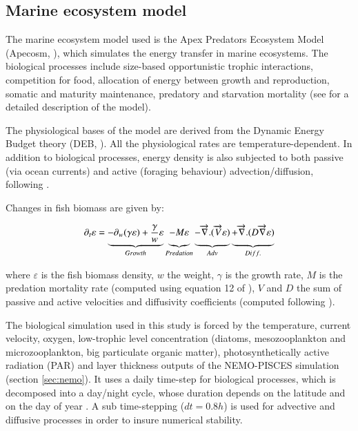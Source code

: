 \subsection{Marine ecosystem model}
\label{sec:apecosm}

The marine ecosystem model used is the Apex Predators Ecosystem Model (Apecosm, \citealt{mauryModelingEnvironmentalEffects2007, mauryOverviewAPECOSMSpatialized2010}), which simulates the energy transfer in marine ecosystems. The biological processes include size-based opportunistic trophic interactions, competition for food, allocation of energy between growth and reproduction, somatic and maturity maintenance, predatory and starvation mortality (see \citealt{mauryModelingEnvironmentalEffects2007} for a detailed description of the model). 

The physiological bases of the model are derived from the Dynamic Energy Budget theory (DEB, \citealt{kooijmanDynamicEnergyMass2000}). All the physiological rates are temperature-dependent. In addition to biological processes, energy density is also subjected to both passive (via ocean currents) and active (foraging behaviour) advection/diffusion, following \cite{faugerasAdvectiondiffusionreactionSizestructuredFish2005}.

Changes in fish biomass are given by:

\begin{equation}
\partial_t \varepsilon = \underbrace{- \partial_w(\gamma \varepsilon) + \frac{\gamma}{w}\varepsilon}_{Growth} 
\underbrace{- M \varepsilon \vphantom{\frac{\gamma}{w}\varepsilon}}_{Predation}
\underbrace{-\overrightarrow{\nabla}.(\overrightarrow{V} \varepsilon) \vphantom{\frac{\gamma}{w}\varepsilon}}_{Adv} 
\underbrace{+ \overrightarrow{\nabla} . (D \overrightarrow{\nabla} \varepsilon) \vphantom{\frac{\gamma}{w}\varepsilon}}_{Diff.}
\label{eq:apecosm_trend}
\end{equation}

where $\varepsilon$  is the fish biomass density, $w$ the weight, $\gamma$ is the growth rate, $M$ is the predation mortality rate (computed using equation 12 of \citealt{mauryIndividualsPopulationsCommunities2013}), $V$ and $D$ the sum of passive and active velocities and diffusivity coefficients (computed following \citealt{faugerasAdvectiondiffusionreactionSizestructuredFish2005}).

The biological simulation used in this study is forced by the temperature, current velocity, oxygen, low-trophic level concentration (diatoms, mesozooplankton and microzooplankton, big particulate organic matter), photosynthetically active radiation (PAR) and layer thickness outputs of the NEMO-PISCES simulation (section \ref{sec:nemo}). It uses a daily time-step for biological processes, which is decomposed into a day/night cycle, whose duration depends on the latitude and on the day of year \citep{forsytheModelComparisonDaylength1995}. A sub time-stepping ($dt =0.8h$) is used for advective and diffusive processes in order to insure numerical stability.

